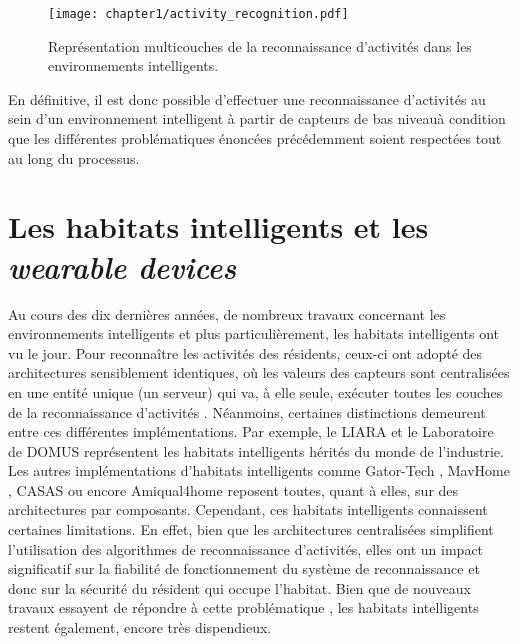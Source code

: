 {{\begin{figure}[t]
	\centering
	\texttt{[image: chapter1/activity\_recognition.pdf]}
	\caption{Représentation multicouches de la reconnaissance d'activités dans les environnements intelligents.}
	\label{fig:activity_recognition}
\end{figure}

En définitive, il est donc possible d'effectuer une reconnaissance d'activités au sein d'un environnement intelligent à partir de capteurs de bas niveau\textemdash à condition que les différentes problématiques énoncées précédemment soient respectées tout au long du processus.

\section{Les habitats intelligents et les \textit{wearable devices}}

Au cours des dix dernières années, de nombreux travaux concernant les environnements intelligents et plus particulièrement, les habitats intelligents ont vu le jour. Pour reconnaître les activités des résidents, ceux-ci ont adopté des architectures sensiblement identiques, où les valeurs des capteurs sont centralisées en une entité unique (un serveur) qui va, à elle seule, exécuter toutes les couches de la reconnaissance d’activités \citep{Bouchard2014, Hu2016}. Néanmoins, certaines distinctions demeurent entre ces différentes implémentations. Par exemple, le \ac{LIARA} \citep{Bouchard2014} et le Laboratoire de \ac{DOMUS} \citep{Giroux2009} représentent les habitats intelligents hérités du monde de l’industrie. Les autres implémentations d'habitats intelligents comme Gator-Tech \citep{Helal2005}, MavHome \citep{DJCook2003}, CASAS \citep{Cook2013} ou encore Amiqual4home \citep{Lago2017} reposent toutes, quant à elles, sur des architectures par composants. Cependant, ces habitats intelligents connaissent certaines limitations. En effet, bien que les architectures centralisées simplifient l'utilisation des algorithmes de reconnaissance d'activités, elles ont un impact significatif sur la fiabilité de fonctionnement du système de reconnaissance et donc sur la sécurité du résident qui occupe l'habitat. Bien que de nouveaux travaux essayent de répondre à cette problématique \citep{Cook2013, Plantevin2018}, les habitats intelligents restent également, encore très dispendieux.

}}
